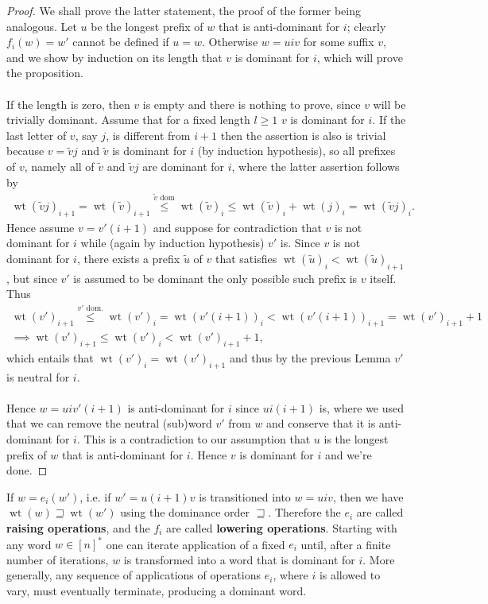 \documentclass{article}
\DeclareMathOperator{\wt}{wt}
\begin{document}
\begin{proof}
We shall prove the latter statement,  the proof of the former being analogous. Let $u$ be the longest prefix of $w$ that is anti-dominant for $i$; clearly $f_i(w)=w'$ cannot be defined if $u=w$. Otherwise $w=uiv$ for some suffix $v$, and we show by induction on its length that $v$ is dominant for $i$, which will prove the proposition. \\
\\
If the length is zero, then $v$ is empty and there is nothing to prove, since $v$ will be trivially dominant. Assume that for a fixed length $l \geq 1$ $v$ is dominant for $i$. If the last letter of $v$, say $j$, is different from $i+1$ then the assertion is also is trivial because $v=\widetilde{v}j$ and $\widetilde{v}$ is dominant for $i$ (by induction hypothesis), so all prefixes of $v$, namely all of $\widetilde{v}$ and $\widetilde{v}j$ are dominant for $i$, where the latter assertion follows by 
\begin{align*}
    \wt( \widetilde{v}j)_{i+1} = \wt(\widetilde{v})_{i+1} \overset{\widetilde{v} \text{ dom}}\leq \wt( \widetilde{v})_i \leq  \wt( \widetilde{v})_i + \wt(j)_i = \wt( \widetilde{v}j)_i.
\end{align*}
Hence assume $v=v'(i+1)$ and suppose for contradiction that $v$ is not dominant for $i$ while (again by induction hypothesis) $v'$ is. Since $v$ is not dominant for $i$, there exists a prefix $\widetilde{u}$ of $v$ that satisfies $\wt(\widetilde{u})_i < \wt(\widetilde{u})_{i+1}$, but since $v'$ is assumed to be dominant the only possible such prefix is $v$ itself. Thus 
\begin{align*}
  \wt(v')_{i+1} \overset{\text{$v'$ dom.}}\leq  \wt(v')_i = \wt(v'(i+1))_i < \wt(v'(i+1))_{i+1} = \wt(v')_{i+1}+1 \\
  \implies \wt(v')_{i+1} \leq \wt(v')_i < \wt(v')_{i+1}+1,
\end{align*} which entails that $\wt(v')_i = \wt(v')_{i+1}$ and thus by the previous Lemma $v'$ is neutral for $i$.
\\\\
Hence $w=uiv'(i+1)$ is anti-dominant for $i$ since $ui(i+1)$ is, where we used that we can remove the neutral (sub)word $v'$ from $w$ and conserve that it is anti-dominant for $i$. This is a contradiction to our assumption that $u$ is the longest prefix of $w$ that is anti-dominant for $i$. Hence $v$ is dominant for $i$ and we're done. 
\end{proof}
If $w= e_i(w')$, i.e. if $w'=u(i+1)v$ is transitioned into $w=uiv$, then we have $\wt(w) \sqsupseteq \wt(w')$ using the dominance order $\sqsupseteq$. Therefore the $e_i$ are called \textbf{raising operations}, and the $f_i$ are called \textbf{lowering operations}. Starting with any word $w \in [n]^*$ one can iterate application of a fixed $e_i$ until, after a finite number of iterations, $w$ is transformed into a word that is dominant for $i$. More generally, any sequence of applications of operations $e_i$, where $i$ is allowed to vary, must eventually terminate, producing a dominant word. 
\newpage
\end{document}
